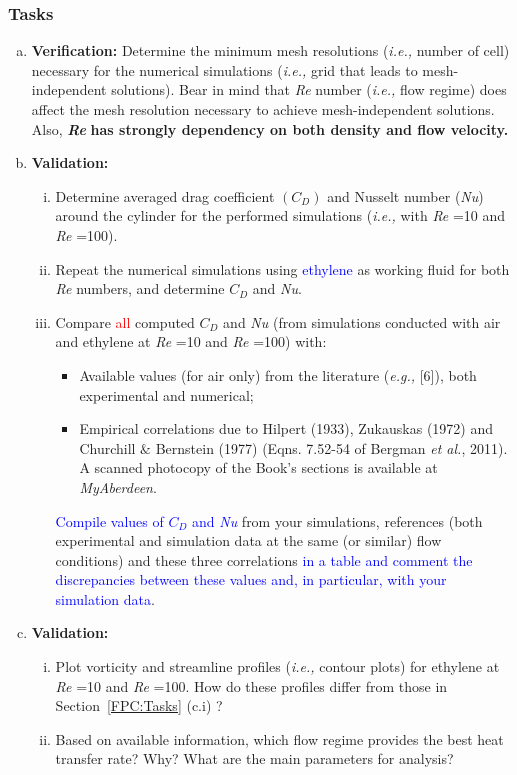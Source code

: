 \documentclass[12pts,a4paper,amsmath,amssymb,floatfix]{article}%
\newcommand{\red}{\textcolor{red}}
\newcommand{\blue}{\textcolor{blue}}
\newcommand{\eg}{{\it e.g., }}
\newcommand{\ie}{{\it i.e., }}
\newcommand\Rey{\mbox{\textit{Re}}\,\,}
\newcommand\Nu{\mbox{\textit{Nu}}\,\,}
\begin{document}
     \begin{shaded}
        \subsubsection{Tasks}\label{FPHC:Tasks}
        \begin{enumerate}[a)]
           \item {\bf Verification:} Determine the minimum mesh resolutions (\ie number of cell) necessary for the numerical simulations (\ie grid that leads to mesh-independent solutions). Bear in mind that \Rey number (\ie flow regime) does affect the mesh resolution necessary to achieve mesh-independent solutions. Also, {\bf \Rey has strongly dependency on both density and flow velocity.}
           \item {\bf Validation:}
             \begin{enumerate}[i)]
               \item Determine averaged drag coefficient $\left(C_{D}\right)$ and Nusselt number ({\it Nu}) around the cylinder for the performed simulations (\ie with \Rey=10 and \Rey=100).
               \item Repeat the numerical simulations using \blue{ethylene} as working fluid for both \Rey numbers, and determine $C_{D}$ and {\it Nu}.
               \item Compare \red{all} computed $C_{D}$ and \Nu (from simulations conducted with air and ethylene at \Rey=10 and \Rey=100) with:
                  \begin{itemize}
                     \item Available values (for air only) from the literature (\eg [6]), both experimental and numerical;
                     \item Empirical correlations due to Hilpert (1933), Zukauskas (1972) and Churchill $\&$ Bernstein (1977) (Eqns. 7.52-54 of Bergman {\it et al.}, 2011). A scanned photocopy of the Book's sections is available at {\it MyAberdeen}.
                  \end{itemize}
                  \blue{Compile values of $C_{D}$ and {\it Nu}} from your simulations, references (both experimental and simulation data at the same (or similar) flow conditions) and these three correlations \blue{in a table and comment the discrepancies between these values and, in particular, with your simulation data}.
            \end{enumerate}
           \item {\bf Validation:}
             \begin{enumerate}[i)]
               \item Plot vorticity and streamline profiles (\ie contour plots) for ethylene at \Rey=10 and \Rey=100. How do these profiles differ from those in Section~\ref{FPC:Tasks} (c.i) ?
               \item Based on available information, which flow regime provides the best heat transfer rate? Why? What are the main parameters for analysis?
             \end{enumerate}
        \end{enumerate}
     \end{shaded}
\end{document}
